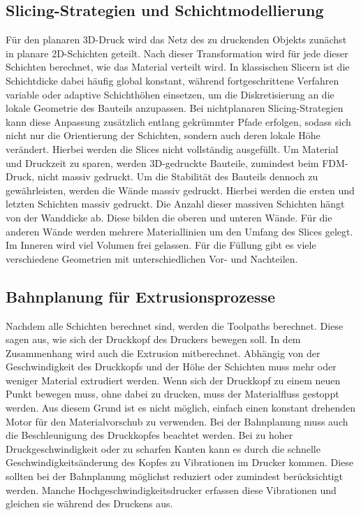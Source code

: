         \subsection{Slicing-Strategien und Schichtmodellierung}\label{subsec:slicing-strategies-and-layer-modeling}
        Für den planaren 3D-Druck wird das Netz des zu druckenden Objekts zunächst in planare 2D-Schichten geteilt.
        Nach dieser Transformation wird für jede dieser Schichten berechnet, wie das Material verteilt wird.
        In klassischen Slicern ist die Schichtdicke dabei häufig global konstant,
        während fortgeschrittene Verfahren variable oder adaptive Schichthöhen einsetzen,
        um die Diskretisierung an die lokale Geometrie des Bauteils anzupassen.
        Bei nichtplanaren Slicing-Strategien kann diese Anpassung zusätzlich entlang gekrümmter Pfade erfolgen,
        sodass sich nicht nur die Orientierung der Schichten, sondern auch deren lokale Höhe verändert.
        Hierbei werden die Slices nicht vollständig ausgefüllt.
        Um Material und Druckzeit zu sparen, werden 3D-gedruckte Bauteile, zumindest beim \ac{FDM}-Druck, nicht massiv gedruckt.
        Um die Stabilität des Bauteils dennoch zu gewährleisten, werden die Wände massiv gedruckt.
        Hierbei werden die ersten und letzten Schichten massiv gedruckt.
        Die Anzahl dieser massiven Schichten hängt von der Wanddicke ab.
        Diese bilden die oberen und unteren Wände.
        Für die anderen Wände werden mehrere Materiallinien um den Umfang des Slices gelegt.
        Im Inneren wird viel Volumen frei gelassen.
        Für die Füllung gibt es viele verschiedene Geometrien mit unterschiedlichen Vor- und Nachteilen.
        \cite{palinkasTYPESAPPLICATIONINFILL}
        \cite{sapkotaReviewFusedDeposition2024}

        \subsection{Bahnplanung für Extrusionsprozesse}\label{subsec:path-planning-for-extrusion-processes}
        Nachdem alle Schichten berechnet sind, werden die Toolpaths berechnet.
        Diese sagen aus, wie sich der Druckkopf des Druckers bewegen soll.
        In dem Zusammenhang wird auch die Extrusion mitberechnet.
        Abhängig von der Geschwindigkeit des Druckkopfs und der Höhe der Schichten muss mehr oder weniger Material extrudiert werden.
        Wenn sich der Druckkopf zu einem neuen Punkt bewegen muss, ohne dabei zu drucken, muss der Materialfluss gestoppt werden.
        Aus diesem Grund ist es nicht möglich, einfach einen konstant drehenden Motor für den Materialvorschub zu verwenden.
        Bei der Bahnplanung muss auch die Beschleunigung des Druckkopfes beachtet werden.
        Bei zu hoher Druckgeschwindigkeit oder zu scharfen Kanten kann es durch die schnelle Geschwindigkeitsänderung des Kopfes zu Vibrationen im Drucker kommen.
        Diese sollten bei der Bahnplanung möglichst reduziert oder zumindest berücksichtigt werden.
        Manche Hochgeschwindigkeitsdrucker erfassen diese Vibrationen und gleichen sie während des Druckens aus.
        \cite{ResonanceCompensationKlipper}
        
